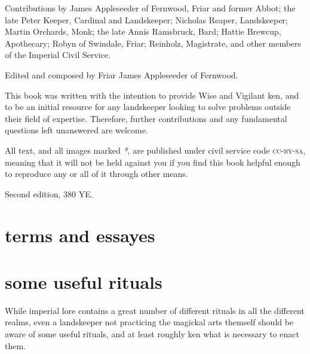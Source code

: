 \documentclass[twoside,9pt,a5paper]{scrbook}
\begin{document}
\begin{uppertitleback}{}
Contributions by James Appleseeder of Fernwood, Friar and former Abbot; the late Peter Keeper, Cardinal and Lands\-keeper; Nicholas Reaper, Lands\-keeper; Martin Orchards, Monk; the late Annis Ramsbruck, Bard; Hattie Brewcup, Apothecary; Robyn of Swindale, Friar; Reinholz, Magistrate, and other members of the Imperial Civil Service.

Edited and composed by Friar James Appleseeder of Fernwood.

This book was written with the intention to provide Wise and Vigilant ken, and to be an initial resource for any landskeeper looking to solve problems outside their field of expertise. Therefore, further contributions and any fundamental questions left unanswered are welcome.

All text, and all images marked \textit{*}, are published under civil service code \textsc{cc-by-sa}, meaning that it will not be held against you if you find this book helpful enough to reproduce any or all of it through other means. 

Second edition, 380 YE.
\end{uppertitleback}
\setlength{\parindent}{1em}

\begingroup
\tableofcontents
\let\cleardoublepage\clearpage
\listoftables
\endgroup

\chapter{terms and essayes}
\pagestyle{scrheadings}
\thispagestyle{scrheadings}
\begin{multicols}{2}

\end{multicols}

\chapter{some useful rituals}
\thispagestyle{scrheadings}
\label{appendix}
While imperial lore contains a great number of different rituals in all the different realms, even a landskeeper not practicing the magickal arts themself should be aware of some useful rituals, and at least roughly ken what is necessary to enact them.
\end{document}
